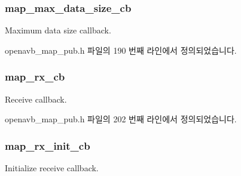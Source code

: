 \subsubsection[{\texorpdfstring{map\+\_\+max\+\_\+data\+\_\+size\+\_\+cb}{map_max_data_size_cb}}]{ map\+\_\+max\+\_\+data\+\_\+size\+\_\+cb}\hypertarget{structopenavb__map__cb__t_ac87069ceed64005bb4a3c8fbb3da8357}{}\label{structopenavb__map__cb__t_ac87069ceed64005bb4a3c8fbb3da8357}


Maximum data size callback. 



openavb\+\_\+map\+\_\+pub.\+h 파일의 190 번째 라인에서 정의되었습니다.

\subsubsection[{\texorpdfstring{map\+\_\+rx\+\_\+cb}{map_rx_cb}}]{ map\+\_\+rx\+\_\+cb}\hypertarget{structopenavb__map__cb__t_a354eb0e412d873e04ed0618f600f8fb1}{}\label{structopenavb__map__cb__t_a354eb0e412d873e04ed0618f600f8fb1}


Receive callback. 



openavb\+\_\+map\+\_\+pub.\+h 파일의 202 번째 라인에서 정의되었습니다.

\subsubsection[{\texorpdfstring{map\+\_\+rx\+\_\+init\+\_\+cb}{map_rx_init_cb}}]{ map\+\_\+rx\+\_\+init\+\_\+cb}\hypertarget{structopenavb__map__cb__t_abb274346a258817c73be3d4860cd8c03}{}\label{structopenavb__map__cb__t_abb274346a258817c73be3d4860cd8c03}


Initialize receive callback. 



